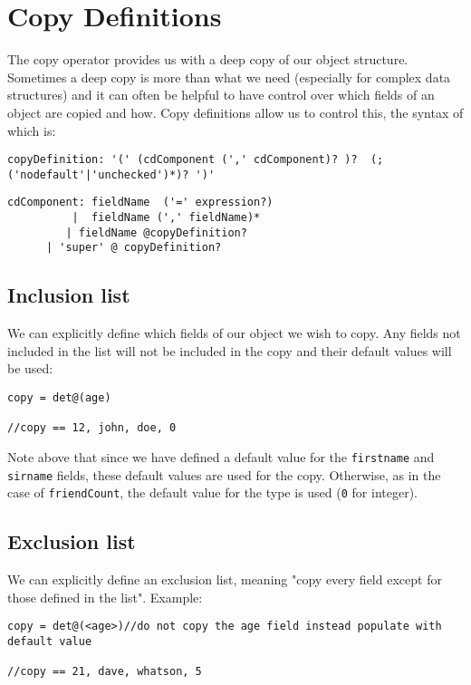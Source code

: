 \documentclass[conc-doc]{subfiles}
\begin{document}
\section{Copy Definitions}
The copy operator provides us with a deep copy of our object structure. Sometimes a deep copy is more than what we need (especially for complex data structures) and it can often be helpful to have control over which fields of an object are copied and how. Copy definitions allow us to control this, the syntax of which is:

\begin{center}
	\lstinline!copyDefinition: '(' (cdComponent (',' cdComponent)? )?  (; ('nodefault'|'unchecked')*)? ')'!
\end{center}

\begin{center}
\lstinline{cdComponent: fieldName  ('=' expression?) 	}\\
\lstinline{          |  fieldName (',' fieldName)* 	}\\
\lstinline{         | fieldName @copyDefinition?  	}\\
\lstinline{      | 'super' @ copyDefinition?}
\end{center}

\subsection{Inclusion list}
We can explicitly define which fields of our object we wish to copy. Any fields not included in the list will not be included in the copy and their default values will be used:

\begin{lstlisting}
copy = det@(age)

//copy == 12, john, doe, 0
\end{lstlisting}

Note above that since we have defined a default value for the \lstinline{firstname} and \lstinline{sirname} fields, these default values are used for the copy. Otherwise, as in the case of \lstinline{friendCount}, the default value for the type is used (\lstinline{0} for integer).

\subsection{Exclusion list}
We can explicitly define an exclusion list, meaning "copy every field except for those defined in the list". Example:
\begin{lstlisting}
copy = det@(<age>)//do not copy the age field instead populate with default value

//copy == 21, dave, whatson, 5
\end{lstlisting}
\end{document}
